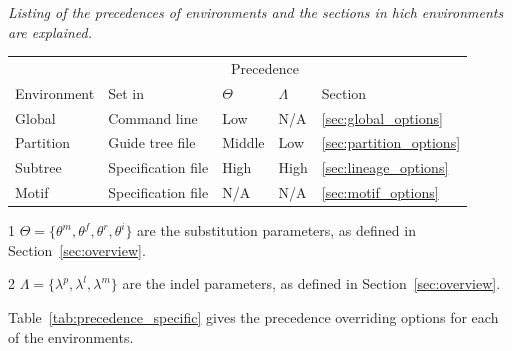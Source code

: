 \documentclass[10pt]{article}
\begin{document}
\begin{center}
\begin{threeparttable}
\caption{\it Listing of the precedences of environments and the sections in hich environments are explained.}
\begin{tabular}{lllll}
\hline\hline
            &        & \multicolumn{2}{c}{Precedence} & \\\cline{3-4} 
Environment & Set in   & $\Theta$\tnote{1} & $\Lambda$\tnote{1} & Section 
\\\hline
Global    & Command line       & Low      & N/A & \ref{sec:global_options} \\
Partition & Guide tree file    & Middle   & Low & \ref{sec:partition_options}\\ 
Subtree   & Specification file & High     & High&\ref{sec:lineage_options} \\
Motif     & Specification file & N/A      & N/A &\ref{sec:motif_options} \\
\hline\hline
\end{tabular}
\begin{tablenotes}
\item[1] $\Theta = \{\theta^m,\theta^f,\theta^r,\theta^i\}$ are the substitution parameters, as defined in Section~\ref{sec:overview}.
\item[2] $\Lambda = \{\lambda^p,\lambda^l,\lambda^m\}$ are the indel parameters, as defined in Section~\ref{sec:overview}.
\end{tablenotes}
\label{tab:precedence}
\end{threeparttable}
\end{center}

Table~\ref{tab:precedence_specific} gives the precedence overriding options for each of the environments.
\end{document}
